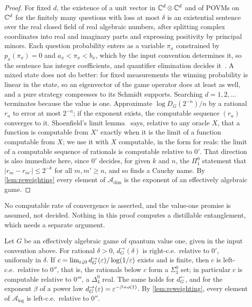 \begin{proof}
For fixed $d$, the existence of a unit vector in $\mathbb C^d\otimes\mathbb C^d$ and of POVMs on $\mathbb C^d$ for the finitely many questions with loss at most
$\delta$ is an existential sentence over the real closed field of real algebraic numbers, after splitting complex coordinates into real
and imaginary parts and expressing positivity by principal minors. Each question probability enters as a variable $\pi_x$ constrained by
$p_x(\pi_x)=0$ and $a_x<\pi_x<b_x$, which by the input convention determines it, so the sentence has integer coefficients, and quantifier
elimination decides it~\cite{Sei54,CM12}. A mixed state does not do better: for fixed measurements the winning probability is linear in the
state, so an eigenvector of the game operator does at least as well, and a pure strategy compresses to its Schmidt supports. Searching
$d=1,2,\dots$ terminates because the value is one. Approximate $\log D_G(2^{-n})/n$ by a rational $r_n$ to error at most $2^{-n}$; if the
exponent exists, the computable sequence $(r_n)$ converges to it. Shoenfield's limit lemma~\cite{Sho59} says, relative to any oracle $X$,
that a function is computable from $X'$ exactly when it is the limit of a function computable from $X$; we use it with $X$ computable, in
the form for reals: the limit of a computable sequence of rationals is computable relative to $0'$. That direction is also immediate here,
since $0'$ decides, for given $k$ and $n$, the $\Pi^0_1$ statement that $|r_m-r_{m'}|\le2^{-k}$ for all $m,m'\ge n$, and so finds a Cauchy
name. By \cref{lem:reweighting} every element of $\mathcal A_{\dim}$ is the exponent of an effectively algebraic game.
\end{proof}

No computable rate of convergence is asserted, and the value-one promise is assumed, not decided. Nothing in this proof computes a
distillable entanglement, which needs a separate argument.

\begin{theorem}\label{thm:arithmetic}
Let $G$ be an effectively algebraic game of quantum value one, given in the input convention above. For rational $\delta>0$,
$d^\to_G(\delta)$ is right-c.e.\ relative to $0'$,
uniformly in $\delta$. If $c=\lim_{\varepsilon\downarrow0}d^\to_G(\varepsilon)/\log(1/\varepsilon)$ exists and is finite, then $c$ is left-c.e.\ relative to $0''$,
that is, the rationals below $c$ form a $\Sigma^0_3$ set; in particular $c$ is computable relative to $0'''$, a $\Delta^0_4$ real. The same holds
for $d^\leftarrow_G$, and for the exponent $\beta$ of a power law $d^\to_G(\varepsilon)=\varepsilon^{-\beta+o(1)}$. By \cref{lem:reweighting}, every element of
$\mathcal A_{\log}$ is left-c.e.\ relative to $0''$.
\end{theorem}

